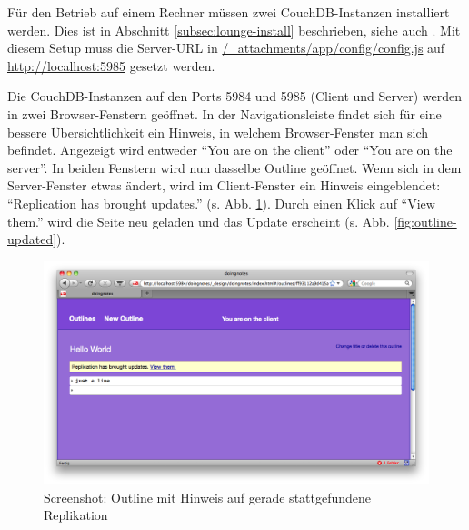 Für den Betrieb auf einem Rechner müssen zwei CouchDB-Instanzen installiert werden. Dies ist in Abschnitt \ref{subsec:lounge-install} beschrieben, siehe auch \cite{lounge:twoinstances}. Mit diesem Setup muss die Server-URL in  {\url{/\_attachments/app/config/config.js}} auf {\url{http://localhost:5985}} gesetzt werden. 

Die CouchDB-Instanzen auf den Ports 5984 und 5985 (Client und Server) werden in zwei Browser-Fenstern geöffnet. In der Navigationsleiste findet sich für eine bessere Übersichtlichkeit ein Hinweis, in welchem Browser-Fenster man sich befindet. Angezeigt wird entweder \enquote{You are on the client} oder \enquote{You are on the server}. In beiden Fenstern wird nun dasselbe Outline geöffnet. Wenn sich in dem Server-Fenster etwas ändert, wird im Client-Fenster ein Hinweis eingeblendet: \enquote{Replication has brought updates.} (s. Abb. \ref{fig:outline-note}). Durch einen Klick auf \enquote{View them.} wird die Seite neu geladen und das Update erscheint (s. Abb. \ref{fig:outline-updated}). 

\medskip
\begin{figure}[ht] 
  \begin{center}
  \includegraphics[width=\textwidth]{grafik/screenshot-outline-replication-note} 
  \end{center}
  \caption{Screenshot: Outline mit Hinweis auf gerade stattgefundene Replikation}
  \label{fig:outline-note} 
\end{figure}



